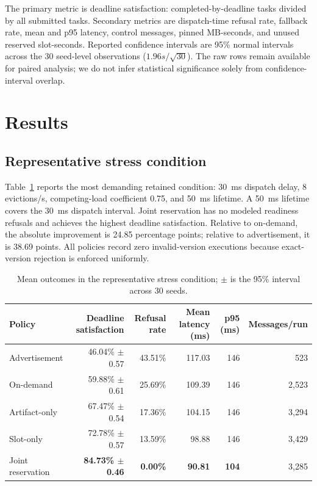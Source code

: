 \documentclass[11pt,a4paper]{article}
\begin{document}
The primary metric is deadline satisfaction: completed-by-deadline tasks divided by all submitted tasks. Secondary metrics are dispatch-time refusal rate, fallback rate, mean and p95 latency, control messages, pinned MB-seconds, and unused reserved slot-seconds. Reported confidence intervals are 95\% normal intervals across the 30 seed-level observations ($1.96s/\sqrt{30}$). The raw rows remain available for paired analysis; we do not infer statistical significance solely from confidence-interval overlap.

\section{Results}

\subsection{Representative stress condition}

Table~\ref{tab:stress} reports the most demanding retained condition: 30~ms dispatch delay, 8 evictions/s, competing-load coefficient 0.75, and 50~ms lifetime. A 50~ms lifetime covers the 30~ms dispatch interval. Joint reservation has no modeled readiness refusals and achieves the highest deadline satisfaction. Relative to on-demand, the absolute improvement is 24.85 percentage points; relative to advertisement, it is 38.69 points. All policies record zero invalid-version executions because exact-version rejection is enforced uniformly.

\begin{table}[ht]
\centering
\caption{Mean outcomes in the representative stress condition; $\pm$ is the 95\% interval across 30 seeds.}
\label{tab:stress}
\small
\begin{tabularx}{\textwidth}{lrrrrr}
\toprule
Policy & Deadline satisfaction & Refusal rate & Mean latency (ms) & p95 (ms) & Messages/run \\
\midrule
Advertisement & 46.04\% $\pm$ 0.57 & 43.51\% & 117.03 & 146 & 523 \\
On-demand & 59.88\% $\pm$ 0.61 & 25.69\% & 109.39 & 146 & 2,523 \\
Artifact-only & 67.47\% $\pm$ 0.54 & 17.36\% & 104.15 & 146 & 3,294 \\
Slot-only & 72.78\% $\pm$ 0.57 & 13.59\% & 98.88 & 146 & 3,429 \\
Joint reservation & \textbf{84.73\% $\pm$ 0.46} & \textbf{0.00\%} & \textbf{90.81} & \textbf{104} & 3,285 \\
\bottomrule
\end{tabularx}
\end{table}
\end{document}
